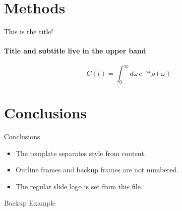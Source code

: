 \documentclass[10pt,aspectratio=43]{beamer}
\begin{document}

\section{Methods}

\begin{frame}{This is the title!}
\framesubtitle{Title and subtitle live in the upper band}

\begin{equation*}
  C(t) = \int_0^\infty d\omega\, e^{-\omega t}\rho(\omega)
\end{equation*}


\end{frame}


\section{Conclusions}

\begin{frame}{Conclusions}
\begin{itemize}
  \item The template separates style from content.
  \item Outline frames and backup frames are not numbered.
  \item The regular slide logo is set from this file.
\end{itemize}
\end{frame}

\backupsection

\begin{backupframe}{Backup Example}
\centering
{}
\end{backupframe}
\end{document}
